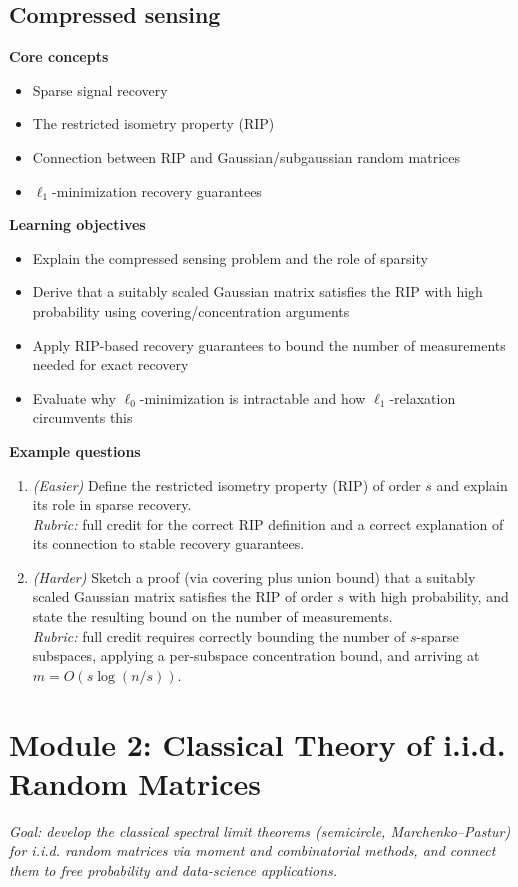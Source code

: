 \documentclass[11pt]{article}
\begin{document}
\subsection{Compressed sensing}
\textbf{Core concepts}
\begin{itemize}[nosep]
\item Sparse signal recovery
\item The restricted isometry property (RIP)
\item Connection between RIP and Gaussian/subgaussian random matrices
\item $\ell_1$-minimization recovery guarantees
\end{itemize}
\textbf{Learning objectives}
\begin{itemize}[nosep]
\item Explain the compressed sensing problem and the role of sparsity
\item Derive that a suitably scaled Gaussian matrix satisfies the RIP with high probability using covering/concentration arguments
\item Apply RIP-based recovery guarantees to bound the number of measurements needed for exact recovery
\item Evaluate why $\ell_0$-minimization is intractable and how $\ell_1$-relaxation circumvents this
\end{itemize}
\textbf{Example questions}
\begin{enumerate}[nosep]
\item \emph{(Easier)} Define the restricted isometry property (RIP) of order $s$ and explain its role in sparse recovery. \\
\emph{Rubric:} full credit for the correct RIP definition and a correct explanation of its connection to stable recovery guarantees.
\item \emph{(Harder)} Sketch a proof (via covering plus union bound) that a suitably scaled Gaussian matrix satisfies the RIP of order $s$ with high probability, and state the resulting bound on the number of measurements. \\
\emph{Rubric:} full credit requires correctly bounding the number of $s$-sparse subspaces, applying a per-subspace concentration bound, and arriving at $m = O(s\log(n/s))$.
\end{enumerate}

\section{Module 2: Classical Theory of i.i.d. Random Matrices}
\emph{Goal: develop the classical spectral limit theorems (semicircle, Marchenko--Pastur) for i.i.d. random matrices via moment and combinatorial methods, and connect them to free probability and data-science applications.}
\end{document}
